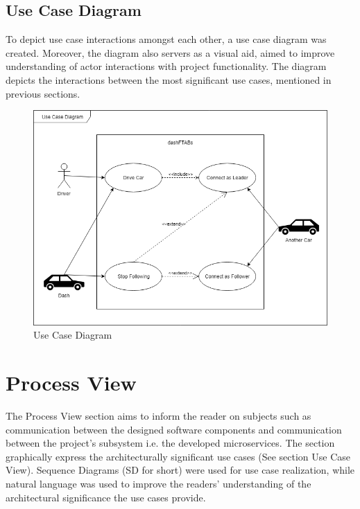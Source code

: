 \documentclass[12pt]{article}
\begin{document}
\subsection{Use Case Diagram}
To depict use case interactions amongst each other, a use case diagram was created. Moreover, the diagram also servers as a visual aid, aimed to improve understanding of actor interactions with project functionality. The diagram depicts the interactions between the most significant use cases, mentioned in previous sections.\par

\FloatBarrier %
\begin{figure}[ht!]
\centering
\includegraphics[width=\linewidth]{Diagrams/UseCaseDiagram.png}
\caption{Use Case Diagram}
\label{fig:usecasediagram}
\end{figure}
\FloatBarrier %

\section{Process View}
The Process View section aims to inform the reader on subjects such as communication between the designed software components and communication between the project's subsystem i.e. the developed microservices. The section graphically express the architecturally significant use cases (See section Use Case View). Sequence Diagrams (SD for short) were used for use case realization, while natural language was used to improve the readers’ understanding of the architectural significance the use cases provide.\par
\end{document}
